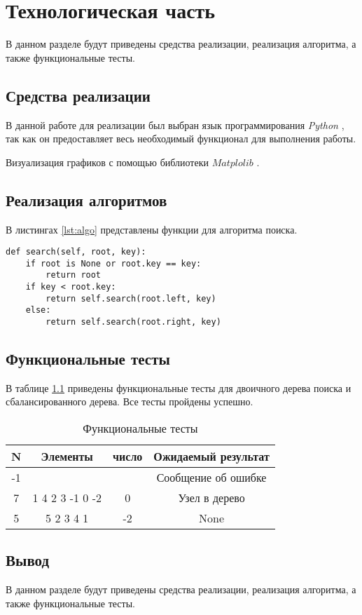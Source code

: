 \chapter{Технологическая часть}

В данном разделе будут приведены средства реализации, реализация алгоритма, а также функциональные тесты.


\section{Средства реализации}

В данной работе для реализации был выбран язык программирования \textit{Python} \cite{bib3}, так как он предоставляет весь необходимый функционал для выполнения работы. 

Визуализация графиков с помощью библиотеки $Matplolib$ \cite{bib4}.

\section{Реализация алгоритмов}

В листингах \ref{lst:algo} представлены функции для алгоритма поиска.

\begin{center}
\captionsetup{justification=raggedright,singlelinecheck=off}
\begin{lstlisting}[label=lst:algo,caption=Функция алгоритма поиска]
def search(self, root, key):
	if root is None or root.key == key:
		return root
	if key < root.key:
		return self.search(root.left, key)
	else:
		return self.search(root.right, key)
\end{lstlisting}
\end{center}

\section{Функциональные тесты}

В таблице \ref{tbl:functional_test} приведены функциональные тесты для двоичного дерева поиска и сбалансированного дерева. Все тесты пройдены успешно.

\begin{table}[h]
	\begin{center}
	\begin{threeparttable}
		\captionsetup{justification=raggedright,singlelinecheck=off}
		\caption{\label{tbl:functional_test} Функциональные тесты}
		\begin{tabular}{|c|c|c|c|}
			\hline
			 N & Элементы & число & Ожидаемый результат 
			\\ \hline
			-1 &  &  & Сообщение об ошибке 
			\\ \hline
			 7 & 1 4 2 3 -1 0 -2 & 0 & Узел в дерево 
			\\ \hline
			 5 & 5 2 3 4 1 & -2 & None 
			\\ \hline
		\end{tabular}
	\end{threeparttable}
	\end{center}
\end{table}

\section*{Вывод}

В данном разделе будут приведены средства реализации, реализация алгоритма, а также функциональные тесты.
